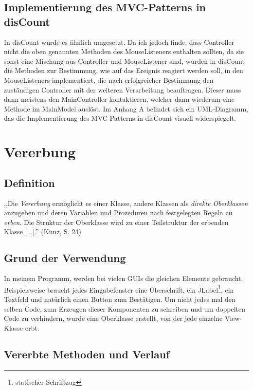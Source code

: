\documentclass[12pt]{report}
\begin{document}
\subsection{Implementierung des MVC-Patterns in disCount}
In disCount wurde es ähnlich umgesetzt. Da ich jedoch finde, dass Controller nicht die oben genannten Methoden des MouseListeners enthalten sollten, da sie sonst eine Mischung aus Controller und MouseListener sind, wurden in disCount die Methoden zur Bestimmung, wie auf das Ereignis reagiert werden soll, in den MouseListeners implementiert, die nach erfolgreicher Bestimmung den zuständigen Controller mit der weiteren Verarbeitung beauftragen. Dieser muss dann meistens den MainController kontaktieren, welcher dann wiederum eine Methode im MainModel auslöst. Im Anhang A befindet sich ein UML-Diagramm, das die Implementierung des MVC-Patterns in disCount visuell widerspiegelt.



\section{Vererbung} 
  
\subsection{Definition}
,,Die \textit{Vererbung} ermöglicht es einer Klasse, andere Klassen als  \textit{direkte Oberklassen} anzugeben und deren Variablen und Prozeduren nach festgelegten Regeln zu  \textit{erben}. Die Struktur der Oberklasse wird zu einer Teilstruktur der erbenden Klasse [...].'' (Kunz, S. 24\nocite{Vererbung})
\subsection{Grund der Verwendung}
In meinem Programm, werden bei vielen GUIs die gleichen Elemente gebraucht. Beispielsweise braucht jedes Eingabefenster eine Überschrift, ein JLabel\footnote{statischer Schriftzug}, ein Textfeld und natürlich einen Button zum Bestätigen. Um nicht jedes mal den selben Code, zum Erzeugen dieser Komponenten zu schreiben und um doppelten Code zu verhindern, wurde eine Oberklasse erstellt, von der jede einzelne View-Klasse erbt. 

\subsection{Vererbte Methoden und Verlauf}
\end{document}

